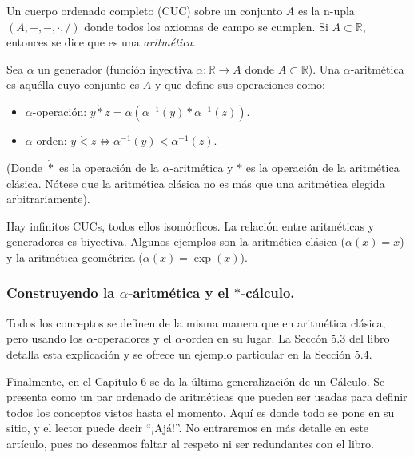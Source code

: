 Un cuerpo ordenado completo (CUC) sobre un conjunto $A$ es la n-upla $(A, +, -, \cdot, /)$ donde todos los axiomas de campo se cumplen. Si $A \subset \mathbb{R}$, entonces se dice que es una \textit{aritmética}.

Sea $\alpha$ un generador (función inyectiva $\alpha: \mathbb{R} \to A$ donde $A \subset \mathbb{R}$). Una $\alpha$-aritmética es aquélla cuyo conjunto es $A$ y que define sus operaciones como:

\begin{itemize}
	\item $\alpha$-operación: $y \dot{*} z = \alpha(\alpha^{-1}(y) * \alpha^{-1}(z))$.
	\item $\alpha$-orden: $y \dot{<} z \iff \alpha^{-1}(y) < \alpha^{-1}(z)$.
\end{itemize}

(Donde $\dot{*}$ es la operación de la $\alpha$-aritmética y $*$ es la operación de la aritmética clásica. Nótese que la aritmética clásica no es más que una aritmética elegida arbitrariamente).

Hay infinitos CUCs, todos ellos isomórficos. La relación entre aritméticas y generadores es biyectiva. Algunos ejemplos son la aritmética clásica ($\alpha(x) = x$) y la aritmética geométrica ($\alpha(x) = \exp(x)$).

\subsubsection{Construyendo la $\alpha$-aritmética y el $*$-cálculo.}

Todos los conceptos se definen de la misma manera que en aritmética clásica, pero usando los $\alpha$-operadores y el $\alpha$-orden en su lugar. La Seccón 5.3 del libro detalla esta explicación y se ofrece un ejemplo particular en la Sección 5.4.

Finalmente, en el Capítulo 6 se da la última generalización de un Cálculo. Se presenta como un par ordenado de aritméticas que pueden ser usadas para definir todos los conceptos vistos hasta el momento. Aquí es donde todo se pone en su sitio, y el lector puede decir \enquote{¡Ajá!}. No entraremos en más detalle en este artículo, pues no deseamos faltar al respeto ni ser redundantes con el libro.
